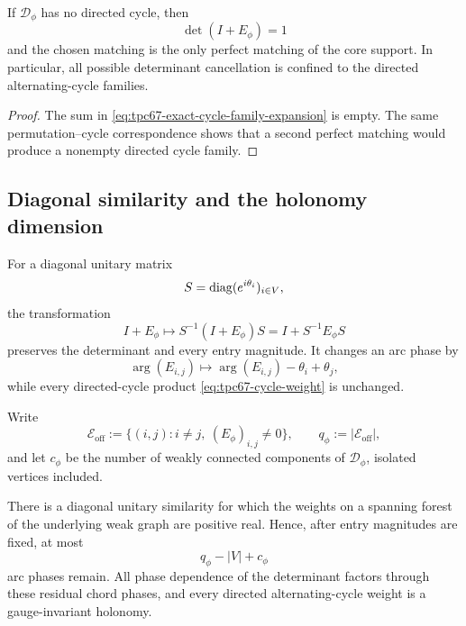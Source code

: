 \begin{corollary}
\label{cor:tpc67-acyclic-core}
If \(\mathcal D_\phi\) has no directed cycle, then
\[
 \det(I+E_\phi)=1
\]
and the chosen matching is the only perfect matching of the core support.
In particular, all possible determinant cancellation is confined to the
directed alternating-cycle families.
\end{corollary}

\begin{proof}
The sum in \eqref{eq:tpc67-exact-cycle-family-expansion} is empty.  The same
permutation--cycle correspondence shows that a second perfect matching
would produce a nonempty directed cycle family.
\end{proof}

\subsection{Diagonal similarity and the holonomy dimension}

For a diagonal unitary matrix
\[
 S=\operatorname{diag}(e^{i\theta_i})_{i\in V},
\]
the transformation
\begin{equation}
 I+E_\phi
 \longmapsto
 S^{-1}(I+E_\phi)S
 =
 I+S^{-1}E_\phi S
 \label{eq:tpc67-diagonal-similarity}
\end{equation}
preserves the determinant and every entry magnitude.  It changes an arc
phase by
\[
 \arg(E_{i,j})\longmapsto
 \arg(E_{i,j})-\theta_i+\theta_j,
\]
while every directed-cycle product
\eqref{eq:tpc67-cycle-weight} is unchanged.

Write
\[
 \mathcal E_{\mathrm{off}}
 :=
 \{(i,j):i\ne j,\ (E_\phi)_{i,j}\ne0\},
 \qquad q_\phi:=|\mathcal E_{\mathrm{off}}|,
\]
and let \(c_\phi\) be the number of weakly connected components of
\(\mathcal D_\phi\), isolated vertices included.

\begin{proposition}
\label{prop:tpc67-holonomy-dimension}
There is a diagonal unitary similarity for which the weights on a spanning
forest of the underlying weak graph are positive real.  Hence, after entry
magnitudes are fixed, at most
\begin{equation}
 \boxed{
 q_\phi-|V|+c_\phi}
 \label{eq:tpc67-holonomy-count}
\end{equation}
arc phases remain.  All phase dependence of the determinant factors through
these residual chord phases, and every directed alternating-cycle weight is
a gauge-invariant holonomy.
\end{proposition}

